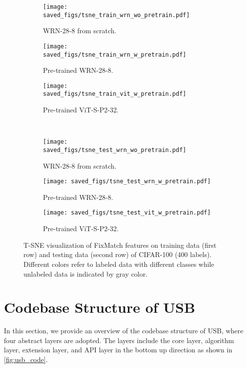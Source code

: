 \documentclass{article}
\begin{document}
\begin{figure}[t!]
\centering
\hfill
\begin{subfigure}{0.3\textwidth}
\centering
    \texttt{[image: saved\_figs/tsne\_train\_wrn\_wo\_pretrain.pdf]}
    \caption{WRN-28-8 from scratch.}
\end{subfigure}\hfill
\begin{subfigure}{0.3\textwidth}
\centering
    \texttt{[image: saved\_figs/tsne\_train\_wrn\_w\_pretrain.pdf]}
    \caption{Pre-trained WRN-28-8.}
\end{subfigure}
\hfill
\begin{subfigure}{0.3\textwidth}
\centering
    \texttt{[image: saved\_figs/tsne\_train\_vit\_w\_pretrain.pdf]}
    \caption{Pre-trained ViT-S-P2-32.}
\end{subfigure}
\hfill
\\
\hfill
\begin{subfigure}{0.3\textwidth}
\centering
    \texttt{[image: saved\_figs/tsne\_test\_wrn\_wo\_pretrain.pdf]}
    \caption{WRN-28-8 from scratch.}
\end{subfigure}\hfill
\begin{subfigure}{0.3\textwidth}
\centering
    \texttt{[image: saved\_figs/tsne\_test\_wrn\_w\_pretrain.pdf]}
    \caption{Pre-trained WRN-28-8.}
\end{subfigure}
\hfill
\begin{subfigure}{0.3\textwidth}
\centering
    \texttt{[image: saved\_figs/tsne\_test\_vit\_w\_pretrain.pdf]}
    \caption{Pre-trained ViT-S-P2-32.}
\end{subfigure}
\hfill
\caption{T-SNE visualization of FixMatch features on training data (first row) and testing data (second row) of CIFAR-100 (400 labels). Different colors refer to labeled data with different classes while unlabeled data is indicated by gray color.}
\label{fig-tsne-train}
\end{figure}



\section{Codebase Structure of USB}
\label{sec-code-structure}

In this section, we provide an overview of the codebase structure of USB, where four abstract layers are adopted. The layers include the core layer, algorithm layer, extension layer, and API layer in the bottom up direction as shown in \cref{fig:usb_code}. 
\end{document}
